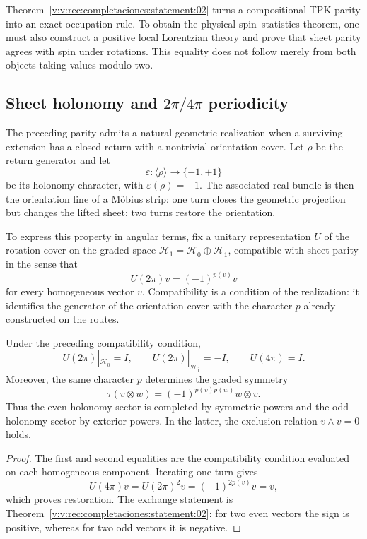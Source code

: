 Theorem~\ref{v:v:rec:completaciones:statement:02} turns a compositional TPK parity into an exact
occupation rule. To obtain the physical spin--statistics theorem, one must
also construct a positive local Lorentzian theory and prove that
sheet parity agrees with spin under rotations. This equality does not
follow merely from both objects taking values modulo two.

\subsection{Sheet holonomy and \texorpdfstring{\(2\pi/4\pi\)}{2pi/4pi} periodicity}
\label{v:v:rec:completaciones:section:05}

The preceding parity admits a natural geometric realization when a
surviving extension has a closed return with a nontrivial orientation
cover. Let \(\rho\) be the return generator and let
\[
 \varepsilon:\langle\rho\rangle\longrightarrow\{-1,+1\}
\]
be its holonomy character, with \(\varepsilon(\rho)=-1\). The associated real
bundle is then the orientation line of a Möbius strip: one
turn closes the geometric projection but changes the lifted sheet; two
turns restore the orientation.

To express this property in angular terms, fix a unitary
representation \(U\) of the rotation cover on the graded space
\(\mathcal H_1=\mathcal H_{\bar0}\oplus\mathcal H_{\bar1}\), compatible with
sheet parity in the sense that
\[
 U(2\pi)v=(-1)^{p(v)}v
\]
for every homogeneous vector \(v\). Compatibility is a condition of the
realization: it identifies the generator of the orientation cover with the
character \(p\) already constructed on the routes.

\begin{theorem}
\label{v:v:rec:thm:dos-cuatro-pi-estadistica}
Under the preceding compatibility condition,
\[
 U(2\pi)|_{\mathcal H_{\bar0}}=I,
 \qquad
 U(2\pi)|_{\mathcal H_{\bar1}}=-I,
 \qquad
 U(4\pi)=I.
\]
Moreover, the same character \(p\) determines the graded symmetry
\[
 \tau(v\otimes w)=(-1)^{p(v)p(w)}w\otimes v.
\]
Thus the even-holonomy sector is completed by symmetric
powers and the odd-holonomy sector by exterior powers. In
the latter, the exclusion relation \(v\wedge v=0\) holds.
\end{theorem}

\begin{proof}
The first and second equalities are the compatibility condition evaluated
on each homogeneous component. Iterating one turn gives
\[
 U(4\pi)v=U(2\pi)^2v=(-1)^{2p(v)}v=v,
\]
which proves restoration. The exchange statement is
Theorem~\ref{v:v:rec:completaciones:statement:02}: for two even
vectors the sign is positive, whereas for two odd vectors it is negative.
\end{proof}

